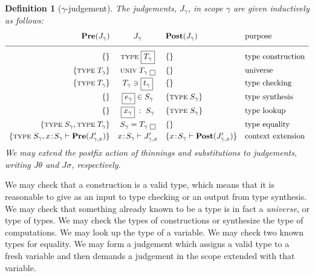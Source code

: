 \documentclass{jfp1}
\newtheorem{definition}[theorem]{Definition}
\begin{document}
\newcommand{\bx}[1]{\framebox{\ensuremath{#1}}}
\newcommand{\ty}[1]{\textsc{type}\;#1}
\newcommand{\univ}[1]{\textsc{univ}\;#1}
\newcommand{\chk}[2]{#1 \ni #2}
\newcommand{\syn}[2]{#1 \in #2}
\newcommand{\cxe}[2]{#1\!:\!#2\vdash}
\newcommand{\cxl}[2]{#1\;:\;#2}
\newcommand{\Pre}[1]{\textbf{Pre}(#1)}
\newcommand{\Post}[1]{\textbf{Post}(#1)}
\begin{definition}[$\gamma$-judgement\label{def:judgement}]
  The judgements, $J_\gamma$, in scope $\gamma$ are given inductively as follows:
  \[\begin{array}{r@{\quad}c@{\quad}l@{\quad}l}
      \Pre{J_\gamma} & J_\gamma& \Post{J_\gamma} & \mbox{purpose} \\
      \hline
      \{\} &\ty{\bx{T_\gamma}}& \{\}  & \mbox{type construction}
                                        \smallskip\\
      \{\ty{T_\gamma}\} &\univ{T_\gamma}\;\bx{}& \{\}  & \mbox{universe}
                                        \smallskip\\
      \{\ty{T_\gamma}\} & \chk{T_\gamma}{\bx{t_\gamma}} &\{\}  & \mbox{type checking}
                                                                 \smallskip\\
      \{\}  & \syn{\bx{e_\gamma}}{S_\gamma} & \{\ty{S_\gamma}\} & \mbox{type synthesis}
                                                                  \smallskip\\
      \{\}  & \cxl{\bx{x_\gamma}}{S_\gamma} & \{\ty{S_\gamma}\} & \mbox{type lookup}
                                                             \smallskip\\
      \{\ty{S_\gamma},\ty{T_\gamma}\} & S_\gamma = T_\gamma\;\bx{} & \{\}  & \mbox{type equality}
                                                                             \smallskip\\
      \{\ty{S_\gamma},\cxe x{S_\gamma} \Pre{J'_{\gamma,x}}\} & \cxe x{S_\gamma} J'_{\gamma,x}
           & \{\cxe x{S_\gamma}\Post{J'_{\gamma,x}}\} & \mbox{context extension} 
    \end{array}\]
  We may extend the postfix action of thinnings and substitutions to
  judgements, writing $J\theta$ and $J\sigma$, respectively.
\end{definition}

We may check that a construction is a valid type, which means that it
is reasonable to give as an input to type checking or an output from
type synthesis. We may check that something already known to be a type is in fact
a \emph{universe}, or type of types. We may check the types of constructions or synthesize
the type of computations. We may look up the type of a variable. We may check two known types
for equality. We may form a judgement which assigns a valid type to a fresh variable and
then demands a judgement in the scope extended with that variable.
\end{document}
